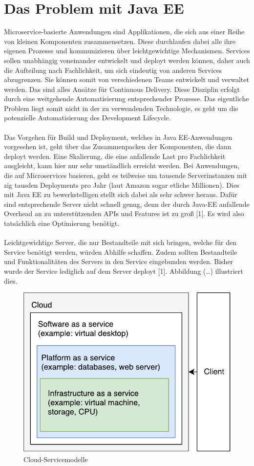 \section{Das Problem mit Java EE}
Microservice-basierte Anwendungen sind Applikationen, die sich aus einer Reihe von kleinen Komponenten zusammensetzen. Diese durchlaufen dabei alle ihre eigenen Prozesse und kommunizieren über leichtgewichtige Mechanismen. Services sollen unabhängig voneinander entwickelt und deployt werden können, daher auch die Aufteilung nach Fachlichkeit, um sich eindeutig von anderen Services abzugrenzen. Sie können somit von verschiedenen Teams entwickelt und verwaltet werden. Das sind alles Ansätze für Continuous Delivery. Diese Disziplin erfolgt durch eine weitgehende Automatisierung entsprechender Prozesse. Das eigentliche Problem liegt somit nicht in der zu verwendenden Technologie, es geht um die potenzielle Automatisierung des Development Lifecycle.\\ \\ 
Das Vorgehen für Build und Deployment, welches in Java EE-Anwendungen vorgesehen ist, geht über das Zusammenpacken der Komponenten, die dann deployt werden. Eine Skalierung, die eine anfallende Last pro Fachlichkeit ausgleicht, kann hier nur sehr umständlich erreicht werden. Bei Anwendungen, die auf Microservices basieren, geht es teilweise um tausende Serverinstanzen mit zig tausden Deployments pro Jahr (laut Amazon sogar etliche Millionen). Dies mit Java EE zu bewerkstelligen stellt sich dabei als sehr schwer heraus. Dafür sind entsprechende Server nicht schnell genug, denn der durch Java-EE anfallende Overhead an zu unterstützenden APIs und Features ist zu groß [1]. Es wird also tatsächlich eine Optimierung benötigt. \\ \\
Leichtgewichtige Server, die nur Bestandteile mit sich bringen, welche für den Service benötigt werden, würden Abhilfe schaffen. Zudem sollten Bestandteile und Funktionalitäten des Servers in den Service eingebunden werden. Bisher wurde der Service lediglich auf dem Server deployt [1]. Abbildung (…) illustriert dies.

\begin{figure}[h!]
	\centering
	\includegraphics[width=0.8\linewidth]{images/servicemodules.pdf}
	\caption{Cloud-Servicemodelle} %
	\label{fig:cnn_structure}
\end{figure}

